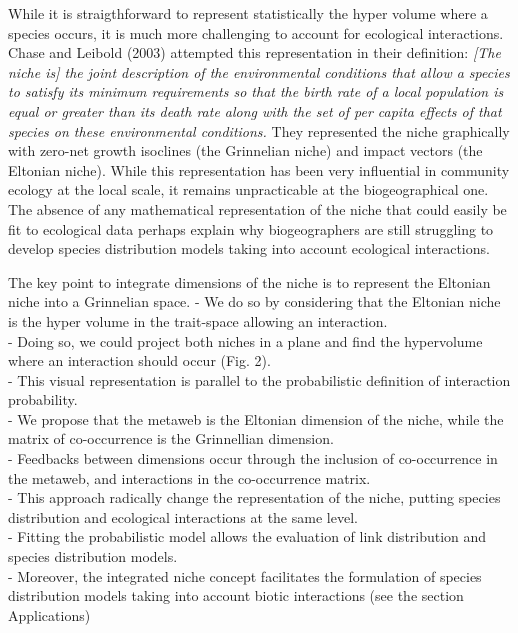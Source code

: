 \documentclass[12pt]{article}
\begin{document}
While it is straigthforward to represent statistically the hyper volume where a species
occurs, it is much more challenging to account for ecological interactions.
Chase and Leibold (2003) attempted this representation in their definition:
\textit{[The niche is] the joint description of the environmental conditions
that allow a species to satisfy its minimum requirements so that the birth rate
of a local population is equal or greater than its death rate along with the set
of per capita effects of that species on these environmental conditions.} They
represented the niche graphically with zero-net growth isoclines (the Grinnelian
niche) and impact vectors (the Eltonian niche). While this representation has
been very influential in community ecology at the local scale, it remains
unpracticable at the biogeographical one.
The absence of any mathematical
representation of the niche that could easily be fit to ecological data perhaps
explain why biogeographers are still struggling to develop species distribution
models taking into account ecological interactions.

The key point to integrate dimensions of the niche is to represent the Eltonian niche into a Grinnelian space. 
- We do so by considering that the Eltonian niche is the hyper volume in the trait-space allowing an interaction. \\
- Doing so, we could project both niches in a plane and find the hypervolume where an interaction should occur (Fig. 2). \\
- This visual representation is parallel to the probabilistic definition of interaction probability. \\
- We propose that the metaweb is the Eltonian dimension of the niche, while the matrix of co-occurrence is the Grinnellian dimension. \\
- Feedbacks between dimensions occur through the inclusion of co-occurrence in the metaweb, and interactions in the co-occurrence matrix. \\
- This approach radically change the representation of the niche, putting species distribution and ecological interactions at the same level. \\
- Fitting the probabilistic model allows the evaluation of link distribution and species distribution models. \\
- Moreover, the integrated niche concept facilitates the formulation of species distribution models taking into account biotic interactions (see the section Applications) \\
\end{document}
